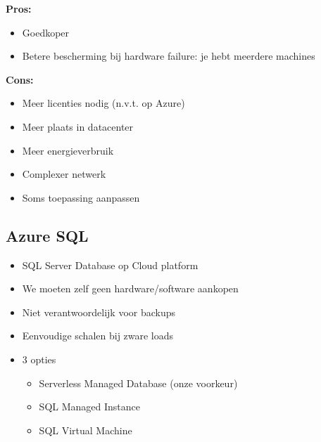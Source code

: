 \documentclass{article}
\newcommand{\bold}[1]{\textbf{#1}}
\begin{document}
\bold{Pros: }
\begin{itemize}
    \item Goedkoper
    \item Betere bescherming bij hardware failure: je hebt meerdere machines
\end{itemize}

\bold{Cons: }

\begin{itemize}
    \item Meer licenties nodig (n.v.t. op Azure)
    \item Meer plaats in datacenter
    \item Meer energieverbruik
    \item Complexer netwerk
    \item Soms toepassing aanpassen
\end{itemize}

\subsection{Azure SQL}

\begin{itemize}
    \item SQL Server Database op Cloud platform
    \item We moeten zelf geen hardware/software aankopen
    \item Niet verantwoordelijk voor backups
    \item Eenvoudige schalen bij zware loads
    \item 3 opties
    \begin{itemize}
        \item Serverless Managed Database (onze voorkeur)
        \item SQL Managed Instance
        \item SQL Virtual Machine
    \end{itemize}
\end{itemize}
\end{document}
